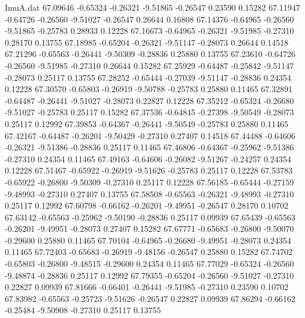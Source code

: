 \begin{filecontents}{ImuA.dat}
  67.09646   -0.65324   -0.26321   -9.51865   -0.26547    0.23590    0.15282
  67.11947   -0.64726   -0.26560   -9.51027   -0.26547    0.26644    0.16808
  67.14376   -0.64965   -0.26560   -9.51865   -0.25783    0.28933    0.12228
  67.16673   -0.64965   -0.26321   -9.51985   -0.27310    0.28170    0.13755
  67.18985   -0.65204   -0.26321   -9.51147   -0.28073    0.26644    0.14518
  67.21296   -0.65563   -0.26441   -9.50309   -0.28836    0.25880    0.13755
  67.23610   -0.64726   -0.26560   -9.51985   -0.27310    0.26644    0.15282
  67.25929   -0.64487   -0.25842   -9.51147   -0.28073    0.25117    0.13755
  67.28252   -0.65444   -0.27039   -9.51147   -0.28836    0.24354    0.12228
  67.30570   -0.65803   -0.26919   -9.50788   -0.25783    0.25880    0.11465
  67.32891   -0.64487   -0.26441   -9.51027   -0.28073    0.22827    0.12228
  67.35212   -0.65324   -0.26680   -9.51027   -0.25783    0.25117    0.15282
  67.37536   -0.64845   -0.27398   -9.50549   -0.28073    0.25117    0.12992
  67.39853   -0.64367   -0.26441   -9.50549   -0.25783    0.25880    0.11465
  67.42167   -0.64487   -0.26201   -9.50429   -0.27310    0.27407    0.14518
  67.44488   -0.64606   -0.26321   -9.51386   -0.28836    0.25117    0.11465
  67.46806   -0.64367   -0.25962   -9.51386   -0.27310    0.24354    0.11465
  67.49163   -0.64606   -0.26082   -9.51267   -0.24257    0.24354    0.12228
  67.51467   -0.65922   -0.26919   -9.51626   -0.25783    0.25117    0.12228
  67.53783   -0.65922   -0.26800   -9.50309   -0.27310    0.25117    0.12228
  67.56185   -0.65444   -0.27159   -9.48993   -0.27310    0.27407    0.13755
  67.58508   -0.65563   -0.26321   -9.48993   -0.27310    0.25117    0.12992
  67.60798   -0.66162   -0.26201   -9.49951   -0.26547    0.28170    0.10702
  67.63142   -0.65563   -0.25962   -9.50190   -0.28836    0.25117    0.09939
  67.65439   -0.65563   -0.26201   -9.49951   -0.28073    0.27407    0.15282
  67.67771   -0.65683   -0.26800   -9.50070   -0.29600    0.25880    0.11465
  67.70104   -0.64965   -0.26680   -9.49951   -0.28073    0.24354    0.11465
  67.72403   -0.65683   -0.26919   -9.48156   -0.26547    0.25880    0.15282
  67.74702   -0.65803   -0.26800   -9.48515   -0.29600    0.24354    0.11465
  67.77029   -0.65324   -0.26560   -9.48874   -0.28836    0.25117    0.12992
  67.79355   -0.65204   -0.26560   -9.51027   -0.27310    0.22827    0.09939
  67.81666   -0.66401   -0.26441   -9.51985   -0.27310    0.23590    0.10702
  67.83982   -0.65563   -0.25723   -9.51626   -0.26547    0.22827    0.09939
  67.86294   -0.66162   -0.25484   -9.50908   -0.27310    0.25117    0.13755

\end{filecontents}
